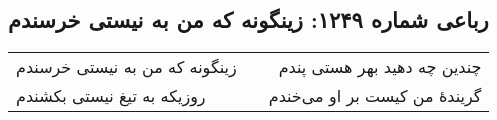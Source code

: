 \begin{center}
\section*{رباعی شماره ۱۲۴۹: زینگونه که من به نیستی خرسندم}
\label{sec:1249}
\begin{longtable}{l p{0.5cm} r}
زینگونه که من به نیستی خرسندم
&&
چندین چه دهید بهر هستی پندم
\\
روزیکه به تیغ نیستی بکشندم
&&
گریندهٔ من کیست بر او می‌خندم
\\
\end{longtable}
\end{center}
